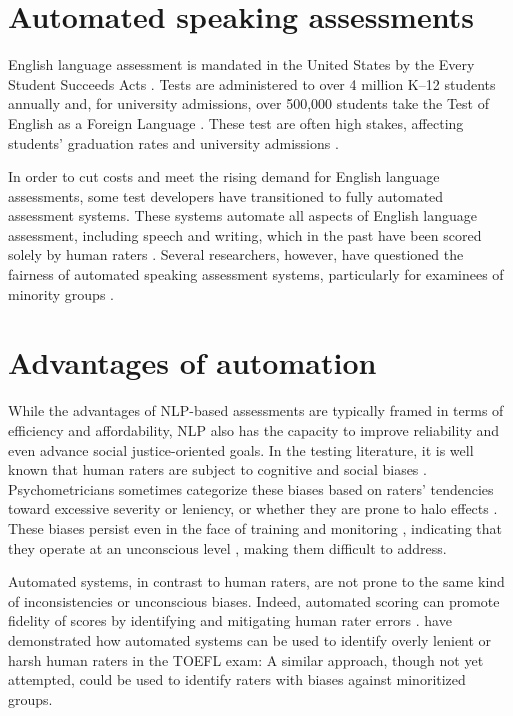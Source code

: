 \documentclass [PhD] {uclathes}
\begin{document}
\section{Automated speaking assessments}

English language assessment is mandated in the United States by the Every Student Succeeds Acts \citep{essa2015}. Tests are administered to over 4 million K–12 students annually \citep{irwin2021report} and, for university admissions, over 500,000 students take the Test of English as a Foreign Language \citep[TOEFL;][]{ets2005}. These test are often high stakes, affecting students’ graduation rates and university admissions \citep{cimpian2017}.

In order to cut costs and meet the rising demand for English language assessments, some test developers have transitioned to fully automated assessment systems. These systems automate all aspects of English language assessment, including speech and writing, which in the past have been scored solely by human raters \citep{evanini2017approaches}. Several researchers, however, have questioned the fairness of automated speaking assessment systems, particularly for examinees of minority groups \citep{wang2018monitoring, collier2020test}.

\section{Advantages of automation}

While the advantages of NLP-based assessments are typically framed in terms of efficiency and affordability, NLP also has the capacity to improve reliability and even advance social justice-oriented goals. In the testing literature, it is well known that human raters are subject to cognitive and social biases \citep{engelhard2002monitoring}. Psychometricians sometimes categorize these biases based on raters’ tendencies toward excessive severity or leniency, or whether they are prone to halo effects \citep{saal1980}. These biases persist even in the face of training and monitoring \citep{engelhard1994examining}, indicating that they operate at an unconscious level \citep{spencer2016}, making them difficult to address.

Automated systems, in contrast to human raters, are not prone to the same kind of inconsistencies or unconscious biases. Indeed, automated scoring can promote fidelity of scores by identifying and mitigating human rater errors \citep{bejar2011validity}. \citet{wang2018monitoring} have demonstrated how automated systems can be used to identify overly lenient or harsh human raters in the TOEFL exam: A similar approach, though not yet attempted, could be used to identify raters with biases against minoritized groups.
\end{document}
